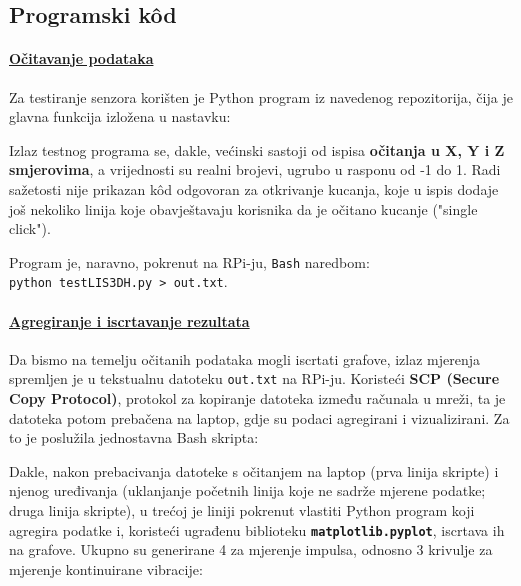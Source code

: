 \documentclass[12pt,a4paper]{article}
\begin{document}
	\subsection{Programski kôd}

	\paragraph{\underline{Očitavanje podataka}} %
	\label{par:reading_data}
		Za testiranje senzora korišten je Python program iz navedenog repozitorija, čija je glavna funkcija izložena u nastavku:

		

		\par Izlaz testnog programa se, dakle, većinski sastoji od ispisa \textbf{očitanja u X, Y i Z smjerovima}, a vrijednosti su realni brojevi, ugrubo u rasponu od -1 do 1. Radi sažetosti nije prikazan kôd odgovoran za otkrivanje kucanja, koje u ispis dodaje još nekoliko linija koje obavještavaju korisnika da je očitano kucanje ("single click").
		\par Program je, naravno, pokrenut na RPi-ju, \texttt{Bash} naredbom: \\
		\texttt {python testLIS3DH.py > out.txt}.


	\paragraph{\underline{Agregiranje i iscrtavanje rezultata}} %
	\label{par:plotting}
		Da bismo na temelju očitanih podataka mogli iscrtati grafove, izlaz mjerenja spremljen je u tekstualnu datoteku \texttt{out.txt} na RPi-ju. Koristeći \textbf{SCP (Secure Copy Protocol)}, protokol za kopiranje datoteka između računala u mreži, ta je datoteka potom prebačena na laptop, gdje su podaci agregirani i vizualizirani. Za to je poslužila jednostavna Bash skripta:

		

		\par Dakle, nakon prebacivanja datoteke s očitanjem na laptop (prva linija skripte) i njenog uređivanja (uklanjanje početnih linija koje ne sadrže mjerene podatke; druga linija skripte), u trećoj je liniji pokrenut vlastiti Python program koji agregira podatke i, koristeći ugrađenu biblioteku \textbf{\texttt{matplotlib.pyplot}}, iscrtava ih na grafove. Ukupno su generirane 4 za mjerenje impulsa, odnosno 3 krivulje za mjerenje kontinuirane vibracije:
\end{document}
